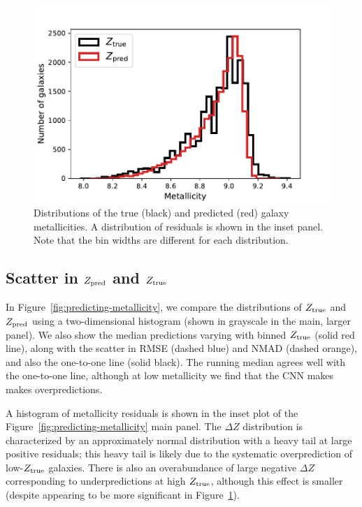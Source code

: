 \documentclass[fleqn,usenatbib]{mnras}
\begin{document}
\begin{figure}
	\includegraphics[width=\columnwidth]{03-Z_distribution.pdf}
	\caption{\label{fig:distributions}
		Distributions of the true (black) and predicted (red) galaxy metallicities.
		A distribution of residuals is shown in the inset panel.
		Note that the bin widths are different for each distribution.}
\end{figure}

\subsection{Scatter in $Z_{\rm pred}$ and $Z_{\rm true}$}


In Figure~\ref{fig:predicting-metallicity}, we compare the distributions of $Z_{\rm true}$ and $Z_{\rm pred}$ using a two-dimensional histogram (shown in grayscale in the main, larger panel).
We also show the median predictions varying with binned $Z_{\rm true}$ (solid red line), along with the scatter in RMSE (dashed blue) and NMAD (dashed orange), and also the one-to-one line (solid black).
The running median agrees well with the one-to-one line, although at low metallicity we find that the CNN makes makes overpredictions.

A histogram of metallicity residuals is shown in the inset plot of the Figure~\ref{fig:predicting-metallicity} main panel.
The $\Delta Z$ distribution is characterized by an approximately normal distribution with a heavy tail at large positive residuals; this heavy tail is likely due to the systematic overprediction of low-$Z_{\rm true}$ galaxies.
There is also an overabundance of large negative $\Delta Z$ corresponding to underpredictions at high $Z_{\rm true}$, although this effect is smaller (despite appearing to be more significant in Figure~\ref{fig:distributions}).
\end{document}
